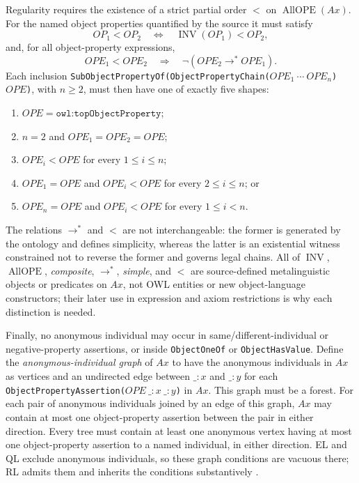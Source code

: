 Regularity requires the existence of a strict partial order \(<\) on
\(\operatorname{AllOPE}(Ax)\).  For the named object properties quantified by
the source it must satisfy
\[
 OP_1<OP_2
 \quad\Longleftrightarrow\quad
 \operatorname{INV}(OP_1)<OP_2,
\]
and, for all object-property expressions,
\[
 OPE_1<OPE_2\quad\Longrightarrow\quad
 \neg(OPE_2\to^{*}OPE_1).
\]
Each inclusion
\texttt{SubObjectPropertyOf(ObjectPropertyChain(\(OPE_1\ \cdots\ OPE_n\))
\(OPE\))}, with \(n\geq2\), must then have one of exactly five shapes:
\begin{enumerate}
\item \(OPE=\texttt{owl:topObjectProperty}\);
\item \(n=2\) and \(OPE_1=OPE_2=OPE\);
\item \(OPE_i<OPE\) for every \(1\leq i\leq n\);
\item \(OPE_1=OPE\) and \(OPE_i<OPE\) for every \(2\leq i\leq n\); or
\item \(OPE_n=OPE\) and \(OPE_i<OPE\) for every \(1\leq i<n\).
\end{enumerate}
The relations \(\to^{*}\) and \(<\) are not interchangeable: the former is
generated by the ontology and defines simplicity, whereas the latter is an
existential witness constrained not to reverse the former and governs legal
chains.  All of \(\operatorname{INV}\), \(\operatorname{AllOPE}\),
\emph{composite}, \(\to^{*}\), \emph{simple}, and \(<\) are source-defined
metalinguistic objects or predicates on \(Ax\), not OWL entities or new
object-language constructors; their later use in expression and axiom
restrictions is why each distinction is needed.

Finally, no anonymous individual may occur in same/different-individual or
negative-property assertions, or inside \texttt{ObjectOneOf} or
\texttt{ObjectHasValue}.  Define the \emph{anonymous-individual graph} of
\(Ax\) to have the anonymous individuals in \(Ax\) as vertices and an
undirected edge between \(\_\!:\!x\) and \(\_\!:\!y\) for each
\texttt{ObjectPropertyAssertion(\(OPE\ \_\!:\!x\ \_\!:\!y\))} in \(Ax\).
This graph must be a forest.  For each pair of anonymous individuals joined by
an edge of this graph, \(Ax\) may contain at most one object-property assertion
between the pair in either direction.  Every tree must contain at least one anonymous vertex having at
most one object-property assertion to a named individual, in either direction.
EL and QL exclude anonymous individuals, so these graph conditions are vacuous
there; RL admits them and inherits the conditions substantively
\cite[\S\S3.1, 5.8.1, and~11]{W3COWL2Syntax2012}.

